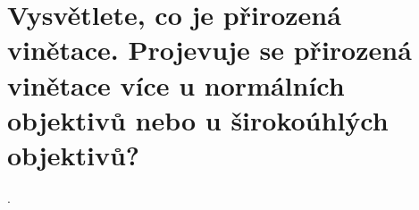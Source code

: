 \section{Vysvětlete, co je přirozená vinětace. Projevuje se přirozená vinětace více u normálních objektivů nebo u 
širokoúhlých objektivů?}.